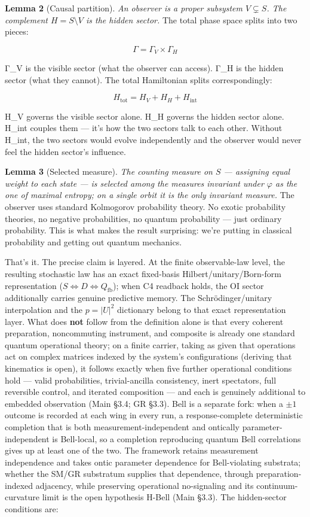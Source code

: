 \documentclass[
]{article}
\begin{document}
\textbf{Lemma 2} (Causal partition). \emph{An observer is a proper
subsystem \(V \subsetneq S\). The complement \(H = S \setminus V\) is
the hidden sector.} The total phase space splits into two pieces:

\[\Gamma = \Gamma_V \times \Gamma_H\]

Γ\_V is the visible sector (what the observer can access). Γ\_H is the
hidden sector (what they cannot). The total Hamiltonian splits
correspondingly:

\[H_{\text{tot}} = H_V + H_H + H_{\text{int}}\]

H\_V governs the visible sector alone. H\_H governs the hidden sector
alone. H\_int couples them --- it's how the two sectors talk to each
other. Without H\_int, the two sectors would evolve independently and
the observer would never feel the hidden sector's influence.

\textbf{Lemma 3} (Selected measure). \emph{The counting measure on \(S\)
--- assigning equal weight to each state --- is selected among the
measures invariant under \(\varphi\) as the one of maximal entropy; on a
single orbit it is the only invariant measure.} The observer uses
standard Kolmogorov probability theory. No exotic probability theories,
no negative probabilities, no quantum probability --- just ordinary
probability. This is what makes the result surprising: we're putting in
classical probability and getting out quantum mechanics.

That's it. The precise claim is layered. At the finite observable-law
level, the resulting stochastic law has an exact fixed-basis
Hilbert/unitary/Born-form representation
(\(S \iff D \iff Q_{\mathrm{fb}}\)); when C4 readback holds, the OI
sector additionally carries genuine predictive memory. The
Schrödinger/unitary interpolation and the \(p=|U|^2\) dictionary belong
to that exact representation layer. What does \textbf{not} follow from
the definition alone is that every coherent preparation, noncommuting
instrument, and composite is already one standard quantum operational
theory; on a finite carrier, taking as given that operations act on
complex matrices indexed by the system's configurations (deriving that
kinematics is open), it follows exactly when five further operational
conditions hold --- valid probabilities, trivial-ancilla consistency,
inert spectators, full reversible control, and iterated composition ---
and each is genuinely additional to embedded observation (Main §3.4; GR
§3.3). Bell is a separate fork: when a \(\pm1\) outcome is recorded at
each wing in every run, a response-complete deterministic completion
that is both measurement-independent and ontically parameter-independent
is Bell-local, so a completion reproducing quantum Bell correlations
gives up at least one of the two. The framework retains measurement
independence and takes ontic parameter dependence for Bell-violating
substrata; whether the SM/GR substratum supplies that dependence,
through preparation-indexed adjacency, while preserving operational
no-signaling and its continuum-curvature limit is the open hypothesis
H-Bell (Main §3.3). The hidden-sector conditions are:
\end{document}
